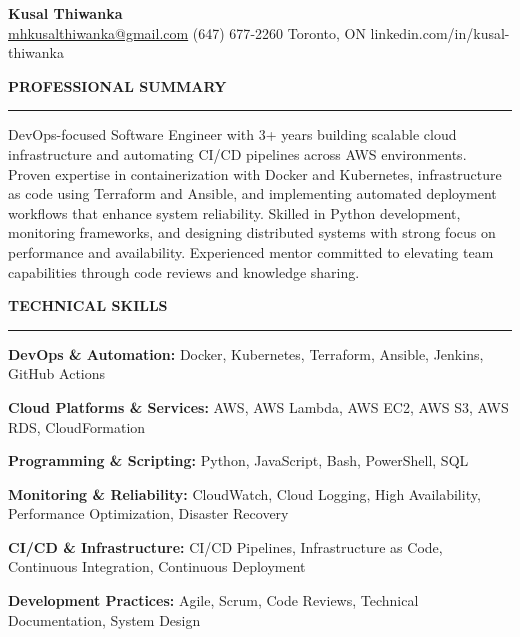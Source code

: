 \documentclass[10pt,letterpaper]{article}
\begin{document}
\begin{center}
{\LARGE\textbf{Kusal Thiwanka}}\\[3pt]
\href{mailto:mhkusalthiwanka@gmail.com}{mhkusalthiwanka@gmail.com}\hspace{2em}%
(647) 677{-}2260\hspace{2em}%
Toronto, ON\hspace{2em}
linkedin.com/in/kusal-thiwanka
\end{center}

\vspace{6pt}

\textbf{PROFESSIONAL SUMMARY}\\[-8pt]
\noindent\rule{\textwidth}{1pt}

\vspace{-2pt}

DevOps-focused Software Engineer with 3+ years building scalable cloud infrastructure and automating CI/CD pipelines across AWS environments. Proven expertise in containerization with Docker and Kubernetes, infrastructure as code using Terraform and Ansible, and implementing automated deployment workflows that enhance system reliability. Skilled in Python development, monitoring frameworks, and designing distributed systems with strong focus on performance and availability. Experienced mentor committed to elevating team capabilities through code reviews and knowledge sharing.

\vspace{8pt}

\textbf{TECHNICAL SKILLS}\\[-8pt]
\noindent\rule{\textwidth}{1pt}

\vspace{-2pt}

\textbf{DevOps \& Automation:} Docker, Kubernetes, Terraform, Ansible, Jenkins, GitHub Actions

\textbf{Cloud Platforms \& Services:} AWS, AWS Lambda, AWS EC2, AWS S3, AWS RDS, CloudFormation

\textbf{Programming \& Scripting:} Python, JavaScript, Bash, PowerShell, SQL

\textbf{Monitoring \& Reliability:} CloudWatch, Cloud Logging, High Availability, Performance Optimization, Disaster Recovery

\textbf{CI/CD \& Infrastructure:} CI/CD Pipelines, Infrastructure as Code, Continuous Integration, Continuous Deployment

\textbf{Development Practices:} Agile, Scrum, Code Reviews, Technical Documentation, System Design
\end{document}
